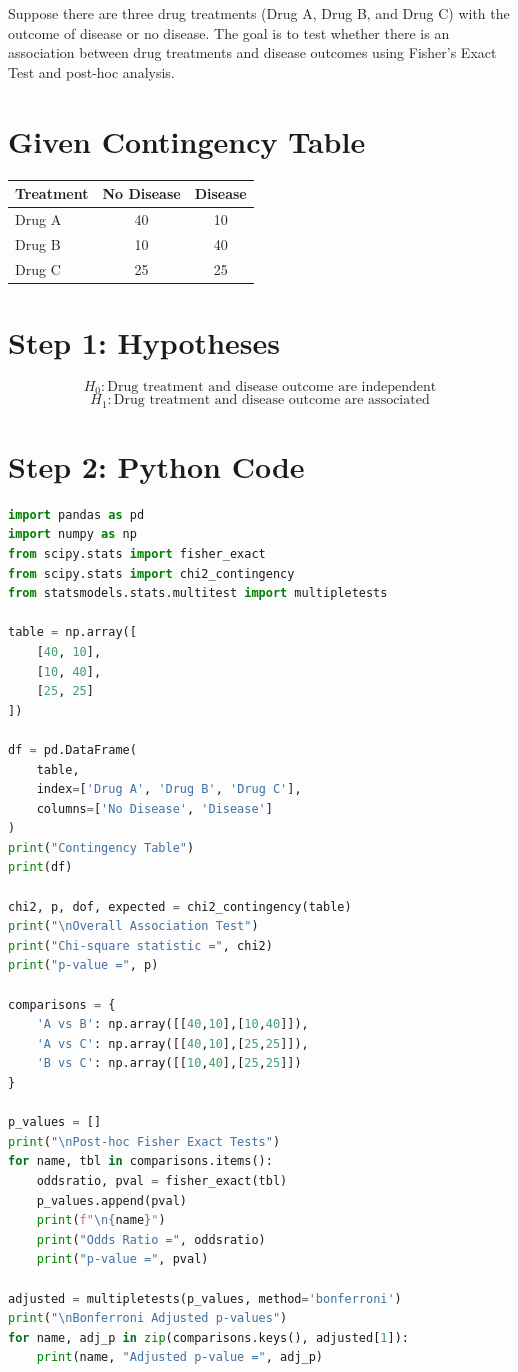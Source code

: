 \documentclass[12pt]{article}
\begin{document}
Suppose there are three drug treatments (Drug A, Drug B, and Drug C) with the outcome of disease or no disease. The goal is to test whether there is an association between drug treatments and disease outcomes using Fisher's Exact Test and post-hoc analysis.

\section*{Given Contingency Table}

\begin{center}
\begin{tabular}{lcc}
\toprule
Treatment & No Disease & Disease \\
\midrule
Drug A & 40 & 10 \\
Drug B & 10 & 40 \\
Drug C & 25 & 25 \\
\bottomrule
\end{tabular}
\end{center}

\section*{Step 1: Hypotheses}

\[
H_0: \text{Drug treatment and disease outcome are independent}
\]
\[
H_1: \text{Drug treatment and disease outcome are associated}
\]

\section*{Step 2: Python Code}

\begin{lstlisting}[language=Python]
import pandas as pd
import numpy as np
from scipy.stats import fisher_exact
from scipy.stats import chi2_contingency
from statsmodels.stats.multitest import multipletests

table = np.array([
    [40, 10],
    [10, 40],
    [25, 25]
])

df = pd.DataFrame(
    table,
    index=['Drug A', 'Drug B', 'Drug C'],
    columns=['No Disease', 'Disease']
)
print("Contingency Table")
print(df)

chi2, p, dof, expected = chi2_contingency(table)
print("\nOverall Association Test")
print("Chi-square statistic =", chi2)
print("p-value =", p)

comparisons = {
    'A vs B': np.array([[40,10],[10,40]]),
    'A vs C': np.array([[40,10],[25,25]]),
    'B vs C': np.array([[10,40],[25,25]])
}

p_values = []
print("\nPost-hoc Fisher Exact Tests")
for name, tbl in comparisons.items():
    oddsratio, pval = fisher_exact(tbl)
    p_values.append(pval)
    print(f"\n{name}")
    print("Odds Ratio =", oddsratio)
    print("p-value =", pval)

adjusted = multipletests(p_values, method='bonferroni')
print("\nBonferroni Adjusted p-values")
for name, adj_p in zip(comparisons.keys(), adjusted[1]):
    print(name, "Adjusted p-value =", adj_p)
\end{lstlisting}
\end{document}

